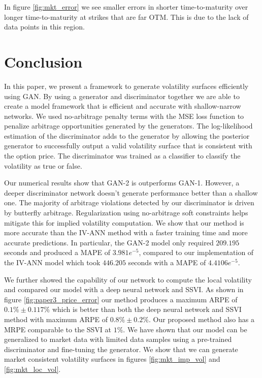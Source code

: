 \documentclass{article}
\theoremstyle{plain}%
\theoremstyle{definition}
\theoremstyle{remark}
\begin{document}
In figure \ref{fig:mkt_error} we see smaller errors in shorter time-to-maturity over longer time-to-maturity at strikes that are far OTM. This is due to the lack of data points in this region. 

\section{Conclusion}\label{sec:Conclusion}

In this paper, we present a framework to generate volatility surfaces efficiently using GAN. By using a generator and discriminator together we are able to create a model framework that is efficient and accurate with shallow-narrow networks. We used no-arbitrage penalty terms with the MSE loss function to penalize arbitrage opportunities generated by the generators. The log-likelihood estimation of the discriminator adds to the generator by allowing the posterior generator to successfully output a valid volatility surface that is consistent with the option price. The discriminator was trained as a classifier to classify the volatility as true or false.

Our numerical results show that GAN-2 is outperforms GAN-1. However, a deeper discriminator network doesn't generate performance better than a shallow one. The majority of arbitrage violations detected by our discriminator is driven by butterfly arbitrage. Regularization using no-arbitrage soft constraints helps mitigate this for implied volatility computation. We show that our method is more accurate than the IV-ANN method with a faster training time and more accurate predictions. In particular, the GAN-2 model only required $209.195$ seconds and produced a MAPE of $3.981e^{-5}$, compared to our implementation of the IV-ANN model which took $446.205$ seconds with a MAPE of $4.4106e^{-5}$.

We further showed the capability of our network to compute the local volatility and compared our model with a deep neural network and SSVI. As shown in figure \ref{fig:paper3_price_error} our method produces a maximum ARPE of $0.1\%\pm0.117\%$ which is better than both the deep neural network and SSVI method with maximum ARPE of $0.8\%\pm0.2\%$. Our proposed method also has a MRPE comparable to the SSVI at $1\%$.  We have shown that our model can be generalized to market data with limited data samples using a pre-trained discriminator and fine-tuning the generator. We show that we can generate market consistent volatility surfaces in figures \ref{fig:mkt_imp_vol} and \ref{fig:mkt_loc_vol}.
\end{document}
